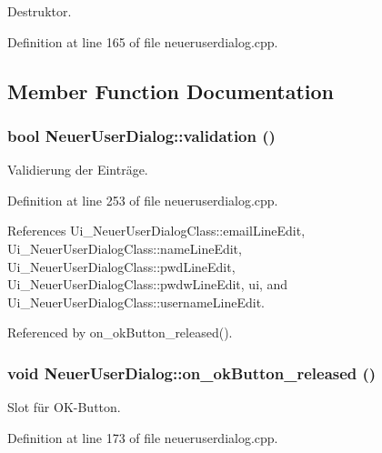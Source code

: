 Destruktor. 



Definition at line 165 of file neueruserdialog.cpp.

\subsection{Member Function Documentation}
\hypertarget{class_neuer_user_dialog_6b115697c371d742e48926b7f084ef5e}{
\subsubsection[validation]{\setlength{\rightskip}{0pt plus 5cm}bool NeuerUserDialog::validation ()}}
\label{class_neuer_user_dialog_6b115697c371d742e48926b7f084ef5e}


Validierung der Einträge. 



Definition at line 253 of file neueruserdialog.cpp.

References Ui\_\-NeuerUserDialogClass::emailLineEdit, Ui\_\-NeuerUserDialogClass::nameLineEdit, Ui\_\-NeuerUserDialogClass::pwdLineEdit, Ui\_\-NeuerUserDialogClass::pwdwLineEdit, ui, and Ui\_\-NeuerUserDialogClass::usernameLineEdit.

Referenced by on\_\-okButton\_\-released().\hypertarget{class_neuer_user_dialog_8efa7a01186a48c4b15abb986fc3388b}{
\subsubsection[on\_\-okButton\_\-released]{\setlength{\rightskip}{0pt plus 5cm}void NeuerUserDialog::on\_\-okButton\_\-released ()}}
\label{class_neuer_user_dialog_8efa7a01186a48c4b15abb986fc3388b}


Slot für OK-Button. 



Definition at line 173 of file neueruserdialog.cpp.

